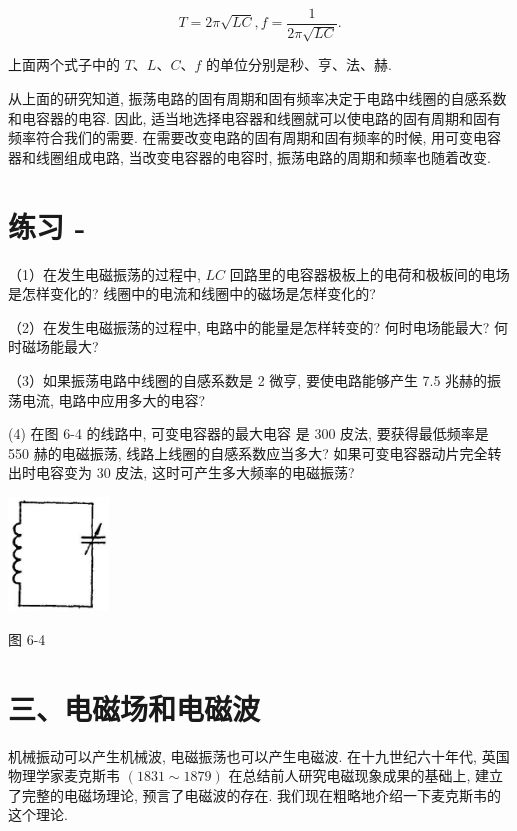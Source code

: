 \documentclass[10pt]{article}
\begin{document}
\[
T = {2\pi }\sqrt{LC},f = \frac{1}{{2\pi }\sqrt{LC}}.
\]

上面两个式子中的 \(T\text{、}L\text{、}C\text{、}f\) 的单位分别是秒、亨、法、赫.

从上面的研究知道, 振荡电路的固有周期和固有频率决定于电路中线圈的自感系数和电容器的电容. 因此, 适当地选择电容器和线圈就可以使电路的固有周期和固有频率符合我们的需要. 在需要改变电路的固有周期和固有频率的时候, 用可变电容器和线圈组成电路, 当改变电容器的电容时, 振荡电路的周期和频率也随着改变.

\section*{练习 -}

（1）在发生电磁振荡的过程中, \({LC}\) 回路里的电容器极板上的电荷和极板间的电场是怎样变化的? 线圈中的电流和线圈中的磁场是怎样变化的?

（2）在发生电磁振荡的过程中, 电路中的能量是怎样转变的? 何时电场能最大? 何时磁场能最大?

（3）如果振荡电路中线圈的自感系数是 2 微亨, 要使电路能够产生 7.5 兆赫的振荡电流, 电路中应用多大的电容?

(4) 在图 6-4 的线路中, 可变电容器的最大电容 是 300 皮法, 要获得最低频率是 550 赫的电磁振荡, 线路上线圈的自感系数应当多大? 如果可变电容器动片完全转出时电容变为 30 皮法, 这时可产生多大频率的电磁振荡?

\begin{center}
\includegraphics[max width=0.2\textwidth]{images/01913056-1f15-74d8-9184-9aab52c9d66b_198_861402.jpg}
\end{center}

图 6-4

\section*{三、电磁场和电磁波}

机械振动可以产生机械波, 电磁振荡也可以产生电磁波. 在十九世纪六十年代, 英国物理学家麦克斯韦 \(\left( {{1831} \sim {1879}}\right)\) 在总结前人研究电磁现象成果的基础上, 建立了完整的电磁场理论, 预言了电磁波的存在. 我们现在粗略地介绍一下麦克斯韦的这个理论.
\end{document}
